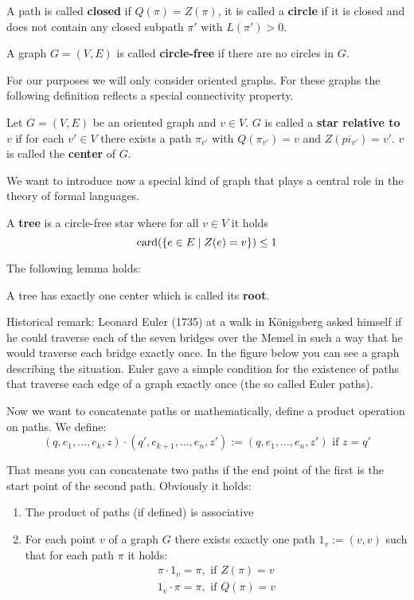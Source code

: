 A path is called {\bf closed} if $Q(\pi) = Z(\pi)$, it is called a {\bf circle}
if it is closed and does not contain any closed subpath $\pi'$ with $L(\pi') >
0$.

\begin{definition}
A graph $G = (V, E)$ is called {\bf circle-free} if there are no circles in $G$.
\end{definition}

For our purposes we will only consider oriented graphs. For these graphs the
following definition reflects a special connectivity property.

\begin{definition}
Let $G = (V, E)$ be an oriented graph and $v \in V$. $G$ is called a {\bf star
relative to $v$} if for each $v' \in V$ there exists a path $\pi_{v'}$ with
$Q(\pi_{v'}) = v$ and $Z(pi_{v'}) = v'$. $v$ is called the {\bf center} of $G$.
\end{definition} 

We want to introduce now a special kind of graph that plays a central role in
the theory of formal languages.

\begin{definition}
A {\bf tree} is a circle-free star where for all $v \in V$ it holds
\[ \mathrm{card}({\mbox{$\{e \in E \mid Z(e) = v\}$}}) \leq 1 \]
\end{definition}

The following lemma holds:
\begin{lemma}
A tree has exactly one center which is called its {\bf root}.
\end{lemma}

Historical remark: Leonard Euler (1735) at a walk in Königsberg asked himself if
he could traverse each of the seven bridges over the Memel in such
a way that he would traverse each bridge exactly once. In the figure below you
can see a graph describing the situation. Euler gave a simple condition for the
existence of paths that traverse each edge of a graph exactly once (the so
called Euler paths).

\begin{center}

\end{center}

Now we want to concatenate paths or mathematically, define a product operation
on paths. We define:
\[ (q, e_1, \ldots, e_k, z) \cdot (q', e_{k+1}, \ldots, e_n, z') := (q, e_1,
\ldots, e_n, z')\text{ if } z = q' \]

That means you can concatenate two paths if the end point of the first is the
start point of the second path. Obviously it holds:
\begin{enumerate}
  \item The product of paths (if defined) is associative
  \item For each point $v$ of a graph $G$ there exists exactly one path $1_v :=
  (v, v)$ such that for each path $\pi$ it holds:
  	\begin{eqnarray*}
    	\pi \cdot 1_v = \pi,\text{ if }Z(\pi) = v \\
    	1_v \cdot \pi = \pi,\text{ if }Q(\pi) = v
  	\end{eqnarray*}
\end{enumerate}

